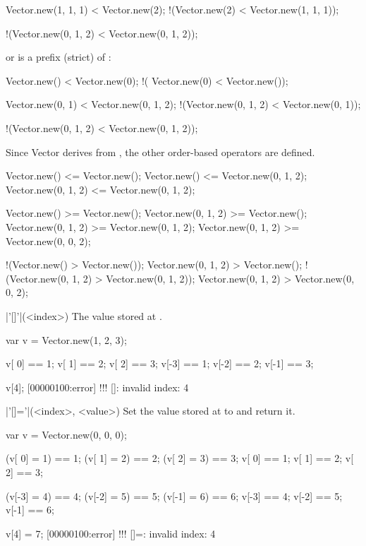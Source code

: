\begin{urbiscriptapi}
\begin{urbiassert}
   Vector.new(1, 1, 1) < Vector.new(2);
 !(Vector.new(2)       < Vector.new(1, 1, 1));

 !(Vector.new(0, 1, 2) < Vector.new(0, 1, 2));
\end{urbiassert}

  \noindent
  or \that is a prefix (strict) of \this:

\begin{urbiassert}
           Vector.new() < Vector.new(0);
  !(      Vector.new(0) < Vector.new());

       Vector.new(0, 1) < Vector.new(0, 1, 2);
  !(Vector.new(0, 1, 2) < Vector.new(0, 1));

  !(Vector.new(0, 1, 2) < Vector.new(0, 1, 2));
\end{urbiassert}

Since Vector derives from , the other order-based
operators are defined.

\begin{urbiassert}
        Vector.new() <= Vector.new();
        Vector.new() <= Vector.new(0, 1, 2);
 Vector.new(0, 1, 2) <= Vector.new(0, 1, 2);

        Vector.new() >= Vector.new();
 Vector.new(0, 1, 2) >= Vector.new();
 Vector.new(0, 1, 2) >= Vector.new(0, 1, 2);
 Vector.new(0, 1, 2) >= Vector.new(0, 0, 2);

       !(Vector.new() > Vector.new());
  Vector.new(0, 1, 2) > Vector.new();
!(Vector.new(0, 1, 2) > Vector.new(0, 1, 2));
  Vector.new(0, 1, 2) > Vector.new(0, 0, 2);
\end{urbiassert}

\item|'[]'|(<index>)%
  The value stored at .
\begin{urbiassert}
var v = Vector.new(1, 2, 3);

v[ 0] == 1; v[ 1] == 2; v[ 2] == 3;
v[-3] == 1; v[-2] == 2; v[-1] == 3;

v[4];
[00000100:error] !!! []: invalid index: 4
\end{urbiassert}

\item|'[]='|(<index>, <value>)%
  Set the value stored at  to  and return it.
\begin{urbiassert}
var v = Vector.new(0, 0, 0);

(v[ 0] = 1) == 1; (v[ 1] = 2) == 2; (v[ 2] = 3) == 3;
 v[ 0]      == 1;  v[ 1]      == 2;  v[ 2]      == 3;

(v[-3] = 4) == 4; (v[-2] = 5) == 5; (v[-1] = 6) == 6;
 v[-3]      == 4;  v[-2]      == 5;  v[-1]      == 6;

v[4] = 7;
[00000100:error] !!! []=: invalid index: 4
\end{urbiassert}
\end{urbiscriptapi}

